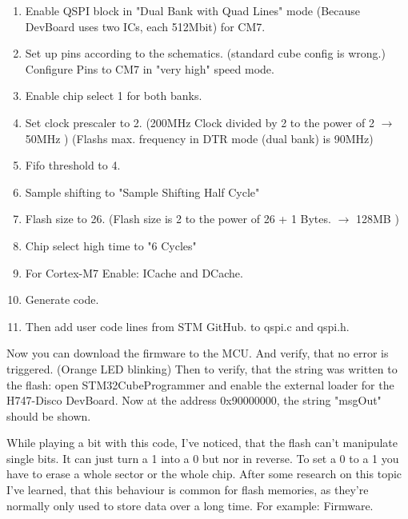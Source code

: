 \begin{enumerate}
	\item Enable QSPI block in "Dual Bank with Quad Lines" mode (Because DevBoard uses two ICs, each 512Mbit) for CM7.
	\item Set up pins according to the schematics. (standard cube config is wrong.) Configure Pins to CM7 in "very high" speed mode.
	\item Enable chip select 1 for both banks.
	\item Set clock prescaler to 2. (200MHz Clock divided by 2 to the power of 2 \(\rightarrow\) 50MHz ) (Flashs max. frequency in DTR mode (dual bank) is 90MHz)
	\item Fifo threshold to 4.
	\item Sample shifting to "Sample Shifting Half Cycle"
	\item Flash size to 26. (Flash size is 2 to the power of 26 + 1 Bytes. \(\rightarrow\) 128MB )
	\item Chip select high time to "6 Cycles"
	\item For Cortex-M7 Enable: ICache and DCache.
	\item Generate code.
	\item Then add user code lines from STM GitHub. \cite{GIT_DRIVER_QSPI_FLASH} to qspi.c and qspi.h.
\end{enumerate}

Now you can download the firmware to the MCU. And verify, that no error is triggered. (Orange LED blinking) Then to verify, that the string was written to the flash: open STM32CubeProgrammer and enable the external loader for the H747-Disco DevBoard. Now at the address 0x90000000, the string "msgOut" should be shown.

\begin{codeblock}
	
\end{codeblock}

While playing a bit with this code, I've noticed, that the flash can't manipulate single bits. It can just turn a 1 into a 0 but nor in reverse. To set a 0 to a 1 you have to erase a whole sector or the whole chip. After some research on this topic I've learned, that this behaviour is common for flash memories, as they're normally only used to store data over a long time. For example: Firmware.



